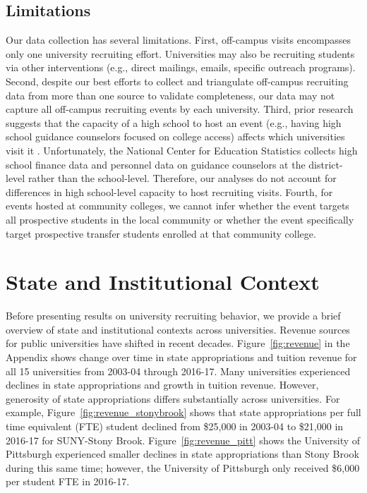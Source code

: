 \documentclass[twoside]{article}
\begin{document}
\subsection*{Limitations}

Our data collection has several limitations. First, off-campus visits encompasses only one university recruiting effort. Universities may also be recruiting students via other interventions (e.g., direct mailings, emails, specific outreach programs). Second, despite our best efforts to collect and triangulate off-campus recruiting data from more than one source to validate completeness, our data may not capture all off-campus recruiting events by each university. Third, prior research suggests that the capacity of a high school to host an event (e.g., having high school guidance counselors focused on college access) affects which universities visit it \citep{RN3519}. Unfortunately, the National Center for Education Statistics collects high school finance data and personnel data on guidance counselors at the district-level rather than the school-level. Therefore, our analyses do not account for differences in high school-level capacity to host recruiting visits.  Fourth, for events hosted at community colleges, we cannot infer whether the event targets all prospective students in the local community or whether the event specifically target prospective transfer students enrolled at that community college.


\section*{State and Institutional Context}

Before presenting results on university recruiting behavior, we provide a brief overview of state and institutional contexts across universities. Revenue sources for public universities have shifted in recent decades. Figure~\ref{fig:revenue} in the Appendix shows change over time in state appropriations and tuition revenue for all 15 universities from 2003-04 through 2016-17. Many universities experienced declines in state appropriations and growth in tuition revenue. However, generosity of state appropriations differs substantially across universities. For example, Figure~\ref{fig:revenue_stonybrook} shows that state appropriations per full time equivalent (FTE) student declined from \$25,000 in 2003-04 to \$21,000 in 2016-17 for SUNY-Stony Brook. Figure~\ref{fig:revenue_pitt} shows the University of Pittsburgh experienced smaller declines in state appropriations than Stony Brook during this same time; however, the University of Pittsburgh only received \$6,000 per student FTE in 2016-17.
\end{document}
